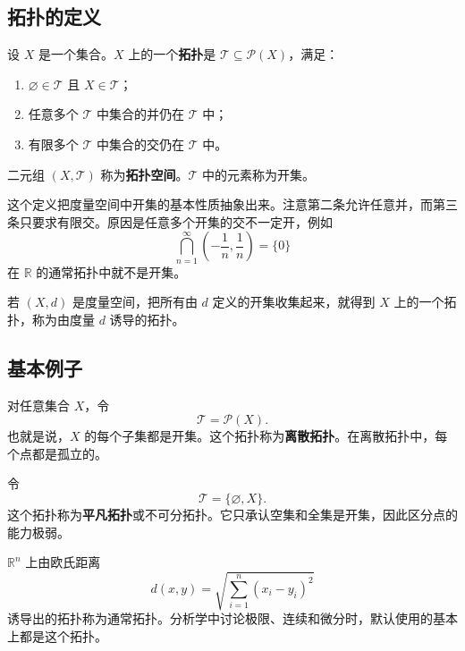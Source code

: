 \subsection{拓扑的定义}

\begin{definition}[拓扑]
设 $X$ 是一个集合。$X$ 上的一个\textbf{拓扑}是 $\mathcal{T}\subseteq\mathcal{P}(X)$，满足：
\begin{enumerate}
    \item $\varnothing\in\mathcal{T}$ 且 $X\in\mathcal{T}$；
    \item 任意多个 $\mathcal{T}$ 中集合的并仍在 $\mathcal{T}$ 中；
    \item 有限多个 $\mathcal{T}$ 中集合的交仍在 $\mathcal{T}$ 中。
\end{enumerate}
二元组 $(X,\mathcal{T})$ 称为\textbf{拓扑空间}。$\mathcal{T}$ 中的元素称为开集。
\end{definition}

这个定义把度量空间中开集的基本性质抽象出来。注意第二条允许任意并，而第三条只要求有限交。原因是任意多个开集的交不一定开，例如
\[
    \bigcap_{n=1}^{\infty}\left(-\frac1n,\frac1n\right)=\{0\}
\]
在 $\mathbb{R}$ 的通常拓扑中就不是开集。

\begin{example}
若 $(X,d)$ 是度量空间，把所有由 $d$ 定义的开集收集起来，就得到 $X$ 上的一个拓扑，称为由度量 $d$ 诱导的拓扑。
\end{example}

\subsection{基本例子}

\begin{example}[离散拓扑]
对任意集合 $X$，令
\[
    \mathcal{T}=\mathcal{P}(X).
\]
也就是说，$X$ 的每个子集都是开集。这个拓扑称为\textbf{离散拓扑}。在离散拓扑中，每个点都是孤立的。
\end{example}

\begin{example}[平凡拓扑]
令
\[
    \mathcal{T}=\{\varnothing,X\}.
\]
这个拓扑称为\textbf{平凡拓扑}或不可分拓扑。它只承认空集和全集是开集，因此区分点的能力极弱。
\end{example}

\begin{example}
$\mathbb{R}^n$ 上由欧氏距离
\[
    d(x,y)=\sqrt{\sum_{i=1}^n(x_i-y_i)^2}
\]
诱导出的拓扑称为通常拓扑。分析学中讨论极限、连续和微分时，默认使用的基本上都是这个拓扑。
\end{example}

